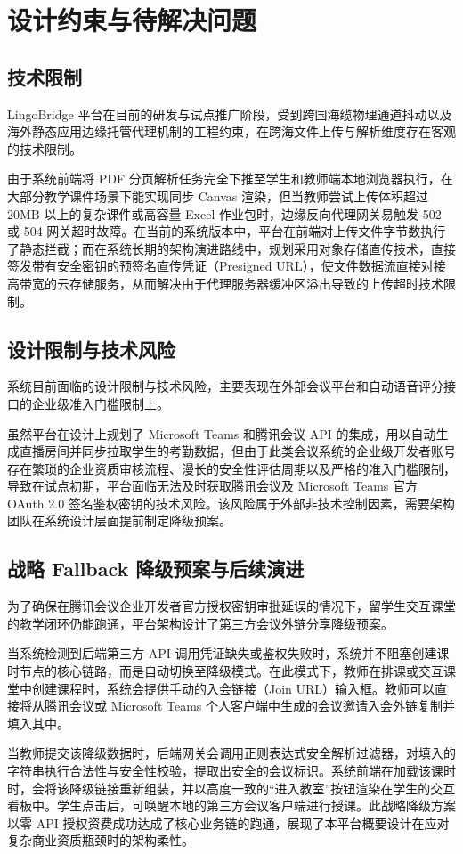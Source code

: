 \chapter{设计约束与待解决问题}

\section{技术限制}
LingoBridge 平台在目前的研发与试点推广阶段，受到跨国海缆物理通道抖动以及海外静态应用边缘托管代理机制的工程约束，在跨海文件上传与解析维度存在客观的技术限制。

由于系统前端将 PDF 分页解析任务完全下推至学生和教师端本地浏览器执行，在大部分教学课件场景下能实现同步 Canvas 渲染，但当教师尝试上传体积超过 20MB 以上的复杂课件或高容量 Excel 作业包时，边缘反向代理网关易触发 502 或 504 网关超时故障。在当前的系统版本中，平台在前端对上传文件字节数执行了静态拦截；而在系统长期的架构演进路线中，规划采用对象存储直传技术，直接签发带有安全密钥的预签名直传凭证（Presigned URL），使文件数据流直接对接高带宽的云存储服务，从而解决由于代理服务器缓冲区溢出导致的上传超时技术限制。

\section{设计限制与技术风险}
系统目前面临的设计限制与技术风险，主要表现在外部会议平台和自动语音评分接口的企业级准入门槛限制上。

虽然平台在设计上规划了 Microsoft Teams 和腾讯会议 API 的集成，用以自动生成直播房间并同步拉取学生的考勤数据，但由于此类会议系统的企业级开发者账号存在繁琐的企业资质审核流程、漫长的安全性评估周期以及严格的准入门槛限制，导致在试点初期，平台面临无法及时获取腾讯会议及 Microsoft Teams 官方 OAuth 2.0 签名鉴权密钥的技术风险。该风险属于外部非技术控制因素，需要架构团队在系统设计层面提前制定降级预案。

\section{战略 Fallback 降级预案与后续演进}
为了确保在腾讯会议企业开发者官方授权密钥审批延误的情况下，留学生交互课堂的教学闭环仍能跑通，平台架构设计了第三方会议外链分享降级预案。

当系统检测到后端第三方 API 调用凭证缺失或鉴权失败时，系统并不阻塞创建课时节点的核心链路，而是自动切换至降级模式。在此模式下，教师在排课或交互课堂中创建课程时，系统会提供手动的入会链接（Join URL）输入框。教师可以直接将从腾讯会议或 Microsoft Teams 个人客户端中生成的会议邀请入会外链复制并填入其中。

当教师提交该降级数据时，后端网关会调用正则表达式安全解析过滤器，对填入的字符串执行合法性与安全性校验，提取出安全的会议标识。系统前端在加载该课时时，会将该降级链接重新组装，并以高度一致的“进入教室”按钮渲染在学生的交互看板中。学生点击后，可唤醒本地的第三方会议客户端进行授课。此战略降级方案以零 API 授权资费成功达成了核心业务链的跑通，展现了本平台概要设计在应对复杂商业资质瓶颈时的架构柔性。
